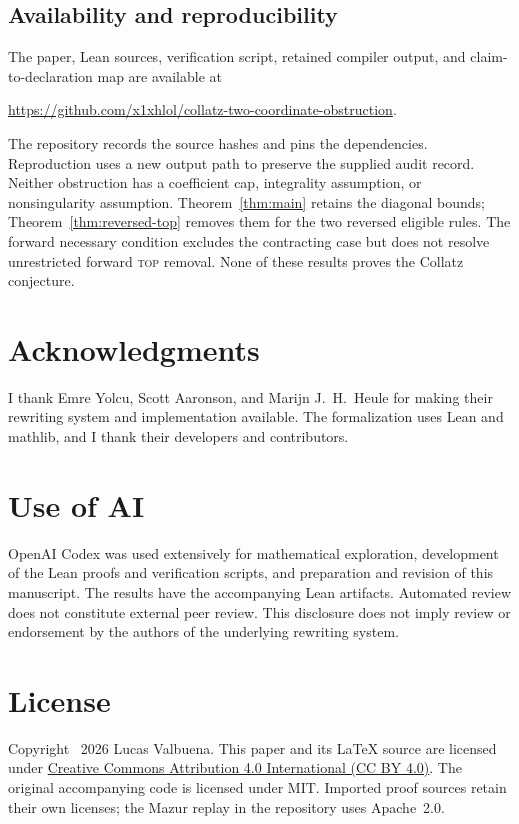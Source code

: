 \documentclass[11pt,a4paper]{article}
\begin{document}
\subsection{Availability and reproducibility}
The paper, Lean sources, verification script, retained compiler output,
and claim-to-declaration map are available at
\begin{center}\small
\url{https://github.com/x1xhlol/collatz-two-coordinate-obstruction}.
\end{center}
The repository records the source hashes and pins the dependencies.
Reproduction uses a new output path to preserve the supplied audit
record. Neither obstruction has a coefficient cap, integrality assumption,
or nonsingularity assumption. Theorem~\ref{thm:main} retains the
diagonal bounds; Theorem~\ref{thm:reversed-top} removes them for the
two reversed eligible rules. The forward necessary condition excludes the contracting case but
does not resolve unrestricted forward \textsc{top} removal.
None of these results proves the Collatz conjecture.

\section*{Acknowledgments}
I thank Emre Yolcu, Scott Aaronson, and Marijn J.\ H.\ Heule for making
their rewriting system and implementation available. The formalization
uses Lean and mathlib, and I thank their developers and contributors.

\section*{Use of AI}
OpenAI Codex was used extensively for mathematical exploration,
development of the Lean proofs and verification scripts, and preparation
and revision of this manuscript. The results have the accompanying
Lean artifacts. Automated review does not constitute external peer review.
This disclosure does not imply review or endorsement by the authors
of the underlying rewriting system.

\section*{License}
Copyright \textcopyright\ 2026 Lucas Valbuena.
This paper and its LaTeX source are licensed under
\href{https://creativecommons.org/licenses/by/4.0/}{Creative Commons
Attribution 4.0 International (CC BY 4.0)}. The original accompanying
code is licensed under MIT. Imported proof sources retain their own
licenses; the Mazur replay in the repository uses Apache~2.0.
\end{document}
